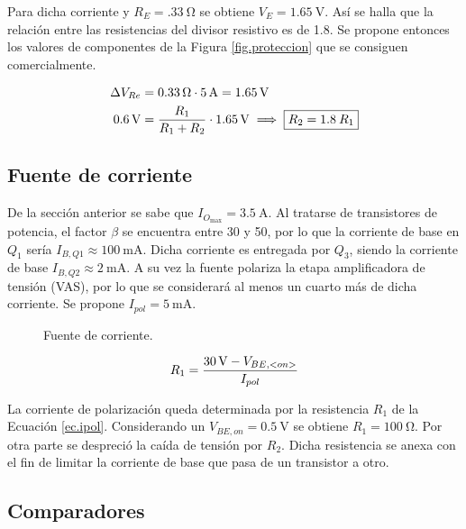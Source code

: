 	Para dicha corriente y $R_{E} = \SI{.33}{\ohm}$ se obtiene $V_{E} = \SI{1.65}{\V}$. Así se halla que la relación entre las resistencias del divisor resistivo es de \num{1,8}. Se propone entonces los valores de componentes de la Figura \ref{fig.proteccion} que se consiguen comercialmente.

	\begin{align}
		\centering
		\Delta V_{Re} &= \SI{0.33}{\ohm} \cdot \SI{5}{\ampere} = \SI{1.65}{\volt} \\
		\SI{0.6}{\volt} &= \frac{R_1}{ R_1 + R_2 } \cdot \SI{1.65}{\volt} \implies \boxed{R_2 = \num{1,8} \: R_1}
	\end{align}

		

\subsection{Fuente de corriente}
	De la sección anterior se sabe que $I_{O_{\max}}=\SI{3.5}{\A}$. Al tratarse de transistores de potencia, el factor $\beta$ se encuentra entre 30 y 50, por lo que la corriente de base en $Q_1$ sería $I_{B,Q1} \approx \SI{100}{\milli\ampere}$. Dicha corriente es entregada por $Q_3$, siendo la corriente de base $I_{B,Q2} \approx \SI{2}{\milli\ampere}$. A su vez la fuente polariza la etapa amplificadora de tensión (VAS), por lo que se considerará al menos un cuarto más de dicha corriente. Se propone $I_{pol} = \SI{5}{\milli\ampere}$.

	\begin{figure}[H]
		\centering
		\scalebox{0.5}{}
		\caption{Fuente de corriente.}
		\label{fig.fte}
	\end{figure}

\begin{equation}
	\centering
	R_1 = \frac{\SI{30}{\volt} - V_{BE, <on>} }{ I_{pol} }
	\label{ec.ipol}
\end{equation}

La corriente de polarización queda determinada por la resistencia $R_1$ de la Ecuación \ref{ec.ipol}. Considerando un $V_{BE,on} = \SI{0.5}{\volt}$ se obtiene $R_1 = \SI{100}{\ohm}$. Por otra parte se despreció la caída de tensión por $R_2$. Dicha resistencia se anexa con el fin de limitar la corriente de base que pasa de un transistor a otro.


\subsection{Comparadores}

